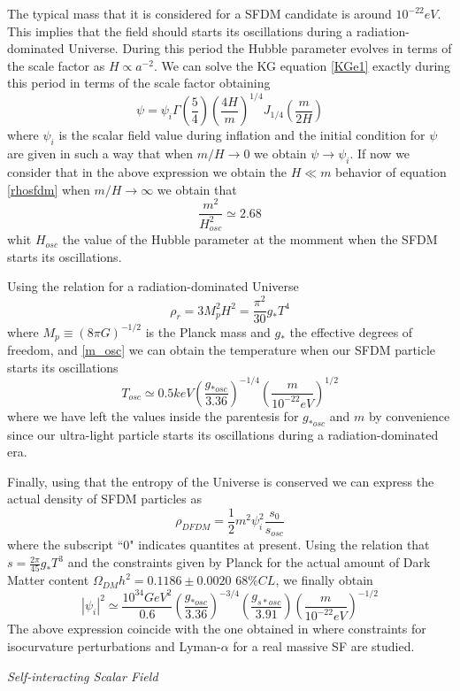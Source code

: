 \documentclass[amssymb,twocolumn,prd,nofootinbib,showpacs]{revtex4-1}
\begin{document}
The typical mass that it is considered for a SFDM candidate is around $10^{-22} eV$. This implies that the field should starts its oscillations during a radiation-dominated Universe. During this period the Hubble parameter evolves in terms of the scale factor as $H\propto a^{-2}$. We can solve the KG equation \eqref{KGe1} exactly during this period in terms of the scale factor obtaining
\begin{equation}
\psi = \psi_i\Gamma\left(\frac{5}{4}\right)\left(\frac{4H}{m}\right)^{1/4}J_{1/4}\left(\frac{m}{2H}\right)
\end{equation}
where $\psi_i$ is the scalar field value during inflation and the initial condition for $\psi$ are given in such a way that when $m/H\rightarrow 0$ we obtain $\psi\rightarrow\psi_i$. If now we consider that in the above expression we obtain the $H\ll m$ behavior of equation \eqref{rhosfdm} when $m/H\rightarrow \infty$ we obtain that
\begin{equation}\label{m_osc}
\frac{m^2}{H_{osc}^2}\simeq 2.68
\end{equation}
whit $H_{osc}$ the value of the Hubble parameter at the momment when the SFDM starts its oscillations.

Using the relation for a radiation-dominated Universe
\begin{equation}
\rho_r = 3M_p^2H^2=\frac{\pi^2}{30}g_*T^4
\end{equation}
where $M_p\equiv (8\pi G)^{-1/2}$ is the Planck mass and $g_*$ the effective degrees of freedom, and \eqref{m_osc} we can obtain the temperature when our SFDM particle starts its oscillations
\begin{equation}
T_{osc}\simeq 0.5 keV\left(\frac{g_{*osc}}{3.36}\right)^{-1/4}\left(\frac{m}{10^{-22}eV}\right)^{1/2}
\end{equation}
where we have left the values inside the parentesis for $g_{*osc}$ and $m$ by convenience since our ultra-light particle starts its oscillations during a radiation-dominated era. 

Finally, using that the entropy of the Universe is conserved we can express the actual density of SFDM particles as
\begin{equation}
\rho_{DFDM}=\frac{1}{2}m^2\psi_i^2\frac{s_0}{s_{osc}}
\end{equation}
where the subscript ``$0$" indicates quantites at present. Using the relation that $s=\frac{2\pi}{45}g_{*}T^3$ and the constraints given by Planck \cite{Planckcolaboration} for the actual amount of Dark Matter content $\Omega_{DM}h^2=0.1186\pm 0.0020$ $68\% CL$, we finally obtain 
\begin{equation}\label{phi_im2}
|\psi_i|^2\simeq\frac{10^{34}GeV^2}{0.6}\left(\frac{g_{*osc}}{3.36}\right)^{-3/4}\left(\frac{g_{s*osc}}{3.91}\right)\left(\frac{m}{10^{-22}eV}\right)^{-1/2}
\end{equation}
The above expression coincide with the one obtained in \cite{SFrev2} where constraints for isocurvature perturbations and Lyman-$\alpha$ for a real massive SF are studied.
\begin{center}
\textit{Self-interacting Scalar Field}
\end{center}
\end{document}
